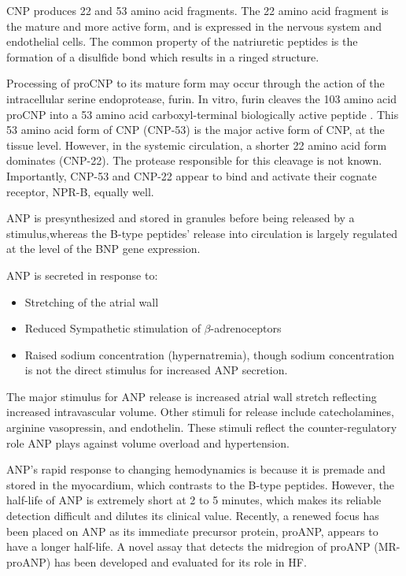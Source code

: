 \documentclass[14pt,a4paper,onecolumn]{extarticle}
\begin{document}
CNP produces 22 and 53 amino acid fragments. The 22 amino acid fragment is the mature and more active form, and is expressed in the nervous system and endothelial cells. The common property of the natriuretic peptides is the formation of a disulfide bond which results in a ringed structure.\citep{Suzuki2001} %

Processing of proCNP to its mature form may occur through the action of the intracellular serine endoprotease, furin. In vitro, furin cleaves the 103 amino acid proCNP into a 53 amino acid carboxyl-terminal biologically active peptide \citep{Wu2003a}. This 53 amino acid form of CNP (CNP-53) is the major active form of CNP, at the tissue level. However, in the systemic circulation, a shorter 22 amino acid form dominates (CNP-22). The protease responsible for this cleavage is not known. Importantly, CNP-53 and CNP-22 appear to bind and activate their cognate receptor, NPR-B, equally well. %

ANP is presynthesized and stored in granules before being released by a stimulus,whereas the B-type peptides’ release into circulation is largely regulated at the level of the BNP gene expression. \citep{Gaggin2014} %

ANP is secreted in response to:      \begin{itemize}          \item Stretching of the atrial wall  \item Reduced Sympathetic stimulation of $\beta$-adrenoceptors          \item Raised sodium concentration (hypernatremia), though sodium concentration is not the direct stimulus for increased ANP secretion. \citep{Widmaier2008} \end{itemize} %

The major stimulus for ANP release is increased atrial wall stretch reflecting increased intravascular volume.  Other stimuli for release include catecholamines, arginine vasopressin, and endothelin.  These stimuli reflect the counter-regulatory role ANP plays against volume overload and hypertension.  \citep{Maisel2018} %

ANP’s rapid response to changing hemodynamics is because it is premade and stored in the myocardium, which contrasts to the B-type peptides. However, the half-life of ANP is extremely short at 2 to 5 minutes, which makes its reliable detection difficult and dilutes its clinical value. Recently, a renewed focus has been placed on ANP as its immediate precursor protein, proANP, appears to have a longer half-life. A novel assay that detects the midregion of proANP (MR-proANP) has been developed and evaluated for its role in HF. \citep{Gaggin2014} %
\end{document}
